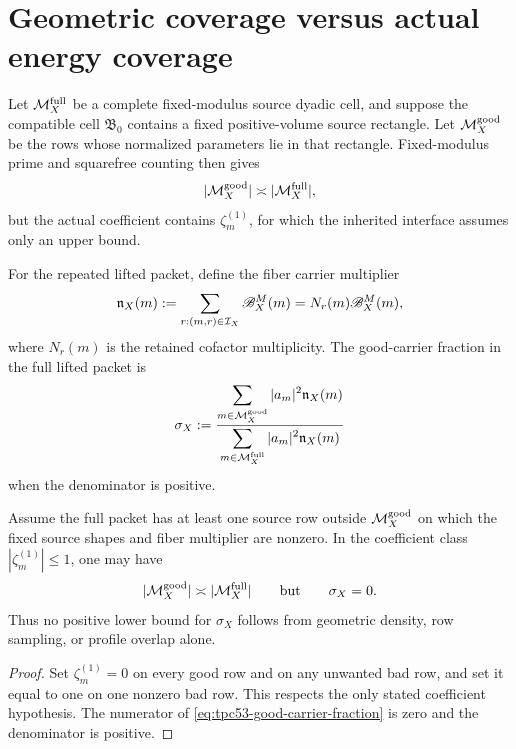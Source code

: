 \section{Geometric coverage versus actual energy coverage}
\label{sec:tpc53-energy}

Let \(\mathcal M_X^{\rm full}\) be a complete fixed-modulus source dyadic cell,
and suppose the compatible cell \(\mathfrak B_0\) contains a fixed
positive-volume source rectangle.  Let \(\mathcal M_X^{\rm good}\) be the rows
whose normalized parameters lie in that rectangle.  Fixed-modulus prime
and squarefree counting then gives
\begin{equation}
 |\mathcal M_X^{\rm good}|\asymp|\mathcal M_X^{\rm full}|,
 \label{eq:tpc53-source-geometric-density}
\end{equation}
but the actual coefficient contains \(\zeta_m^{(1)}\), for which the
inherited interface assumes only an upper bound.

For the repeated lifted packet, define the fiber carrier multiplier
\begin{equation}
 \mathfrak n_X(m)
 :=\sum_{r:(m,r)\in\mathcal I_X}\mathscr B_X^M(m)
 =N_r(m)\mathscr B_X^M(m),
 \label{eq:tpc53-fiber-multiplier}
\end{equation}
where \(N_r(m)\) is the retained cofactor multiplicity.  The good-carrier
fraction in the full lifted packet is
\begin{equation}
 \sigma_X
 :=\frac{\displaystyle
   \sum_{m\in\mathcal M_X^{\rm good}}|a_m|^2\mathfrak n_X(m)}
  {\displaystyle
   \sum_{m\in\mathcal M_X^{\rm full}}|a_m|^2\mathfrak n_X(m)}
 \label{eq:tpc53-good-carrier-fraction}
\end{equation}
when the denominator is positive.

\begin{proposition}
\label{prop:tpc53-zeta-obstruction}
Assume the full packet has at least one source row outside
\(\mathcal M_X^{\rm good}\) on which the fixed source shapes and fiber
multiplier are nonzero.  In the coefficient class
\(|\zeta_m^{(1)}|\le1\), one may have
\begin{equation}
 |\mathcal M_X^{\rm good}|\asymp|\mathcal M_X^{\rm full}|
 \qquad\text{but}\qquad \sigma_X=0.
 \label{eq:tpc53-zero-energy-coverage}
\end{equation}
Thus no positive lower bound for \(\sigma_X\) follows from geometric
density, row sampling, or profile overlap alone.
\end{proposition}

\begin{proof}
Set \(\zeta_m^{(1)}=0\) on every good row and on any unwanted bad row,
and set it equal to one on one nonzero bad row.  This respects the only
stated coefficient hypothesis.  The numerator of
\eqref{eq:tpc53-good-carrier-fraction} is zero and the denominator is
positive.
\end{proof}


